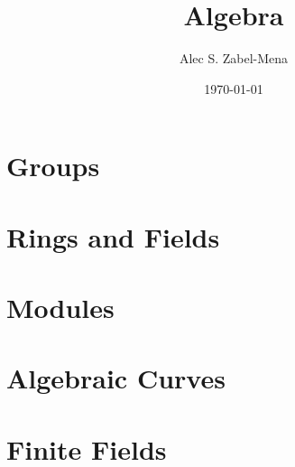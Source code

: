 \documentclass[12pt, twoside]{book}
\title{Algebra}
\author{Alec S. Zabel-Mena}
\date{\today}
\begin{document}
\maketitle
\tableofcontents
\newpage

\part{Groups}






\part{Rings and Fields}








%

\part{Modules}




\part{Algebraic Curves}



\part{Finite Fields}




\nocite{*}



\end{document}

